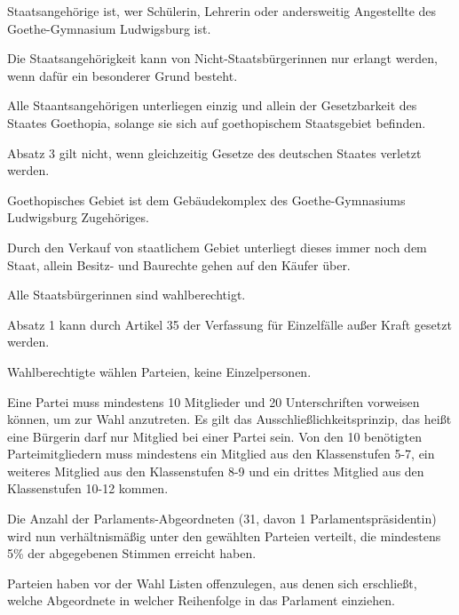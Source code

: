 \documentclass{sasbase}
\begin{document}
\begin{article}[Staatsangehörigkeit]
	\item Staatsangehörige ist, wer Schülerin, Lehrerin oder andersweitig Angestellte des Goethe-Gymnasium Ludwigsburg ist.
	\item Die Staatsangehörigkeit kann von Nicht-Staatsbürgerinnen nur erlangt werden, wenn dafür ein besonderer Grund besteht.
	\item Alle Staantsangehörigen unterliegen einzig und allein der Gesetzbarkeit des Staates Goethopia, solange sie sich auf goethopischem Staatsgebiet befinden.
	\item Absatz 3 gilt nicht, wenn gleichzeitig Gesetze des deutschen Staates verletzt werden.
\end{article}

\begin{article}[Staatsgebiet]
	\item Goethopisches Gebiet ist dem Gebäudekomplex des Goethe-Gymnasiums Ludwigsburg Zugehöriges.
	\item Durch den Verkauf von staatlichem Gebiet unterliegt dieses immer noch dem Staat, allein Besitz- und Baurechte gehen auf den Käufer über.  
\end{article}

\begin{article}[Wahlrecht]
	\item Alle Staatsbürgerinnen sind wahlberechtigt.
	\item Absatz 1 kann durch Artikel 35 der Verfassung für Einzelfälle außer Kraft gesetzt werden.
	\item Wahlberechtigte wählen Parteien, keine Einzelpersonen.
	\item Eine Partei muss mindestens 10 Mitglieder und 20 Unterschriften vorweisen können, um zur Wahl anzutreten. Es gilt das Ausschlie{\ss}lichkeitsprinzip, das hei{\ss}t eine B\"{u}rgerin darf nur Mitglied bei einer Partei sein. Von den 10 ben\"{o}tigten Parteimitgliedern muss mindestens ein Mitglied aus den Klassenstufen 5-7, ein weiteres Mitglied aus den Klassenstufen 8-9 und ein drittes Mitglied aus den Klassenstufen 10-12 kommen.
	\item Die Anzahl der Parlaments-Abgeordneten (31, davon 1 Parlamentspräsidentin) wird nun verhältnismäßig unter den gewählten Parteien verteilt, die mindestens 5\% der abgegebenen Stimmen erreicht haben.
	\item Parteien haben vor der Wahl Listen offenzulegen, aus denen sich erschließt, welche Abgeordnete in welcher Reihenfolge in das Parlament einziehen.
\end{article}
\end{document}
